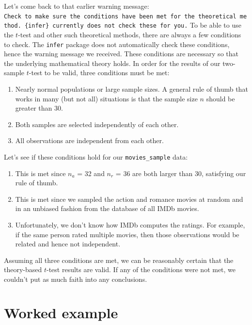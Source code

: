 \documentclass[
]{book}
\providecommand{\tightlist}{%
  \setlength{\itemsep}{0pt}\setlength{\parskip}{0pt}}
\begin{document}
Let's come back to that earlier warning message: \texttt{Check\ to\ make\ sure\ the\ conditions\ have\ been\ met\ for\ the\ theoretical\ method.\ \{infer\}\ currently\ does\ not\ check\ these\ for\ you.} To be able to use the \(t\)-test and other such theoretical methods, there are always a few conditions to check. The \texttt{infer} package does not automatically check these conditions, hence the warning message we received. These conditions are necessary so that the underlying mathematical theory holds. In order for the results of our two-sample \(t\)-test to be valid, three conditions must be met:

\begin{enumerate}
\def\labelenumi{\arabic{enumi}.}
\tightlist
\item
  Nearly normal populations or large sample sizes. A general rule of thumb that works in many (but not all) situations is that the sample size \(n\) should be greater than 30.
\item
  Both samples are selected independently of each other.
\item
  All observations are independent from each other.
\end{enumerate}

Let's see if these conditions hold for our \texttt{movies\_sample} data:

\begin{enumerate}
\def\labelenumi{\arabic{enumi}.}
\tightlist
\item
  This is met since \(n_a\) = 32 and \(n_r\) = 36 are both larger than 30, satisfying our rule of thumb.
\item
  This is met since we sampled the action and romance movies at random and in an unbiased fashion from the database of all IMDb movies.
\item
  Unfortunately, we don't know how IMDb computes the ratings. For example, if the same person rated multiple movies, then those observations would be related and hence not independent.
\end{enumerate}

Assuming all three conditions are met, we can be reasonably certain that the theory-based \(t\)-test results are valid. If any of the conditions were not met, we couldn't put as much faith into any conclusions.

\hypertarget{part-worked-example}{%
\part{Worked example}\label{part-worked-example}}
\end{document}
